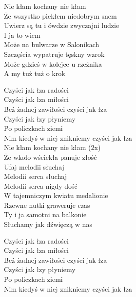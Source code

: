 \begin{text}
    \ifchorded{\hfill\break}
    Nie kłam kochany nie kłam\\
    Że wszystko piekłem niedobrym snem\\
    Uwierz są tu i ówdzie zwyczajni ludzie\\
    I ja to wiem\\
    Może na bulwarze w Salonikach\\
    Szczęścia wypatruje tęskny wzrok\\
    Może gdzieś w kolejce u rzeźnika\\
    A my tuż tuż o krok

    \vin Czyści jak łza radości\\
    \vin Czyści jak łza miłości\\
    \vin Beż żadnej zawiłości czyści jak łza\\
    \vin Czyści jak łzy płyniemy\\
    \vin Po policzkach ziemi\\
    \vin Nim kiedyś w niej znikniemy czyści jak łza\\

    Nie kłam kochany nie kłam (2x)\\
    Że wkoło wściekła panuje złość\\
    Ufaj melodii słuchaj\\
    Melodii serca słuchaj\\
    Melodii serca nigdy dość\\
    W tajemniczym kwiatu medalionie\\
    Rzewne nutki graweruje czas\\
    Ty i ja samotni na balkonie\\
    Słuchamy jak dźwięczą w nas

    \vin Czyści jak łza radości\\
    \vin Czyści jak łza miłości\\
    \vin Beż żadnej zawiłości czyści jak łza\\
    \vin Czyści jak łzy płyniemy\\
    \vin Po policzkach ziemi\\
    \vin Nim kiedyś w niej znikniemy czyści jak łza

\end{text}
